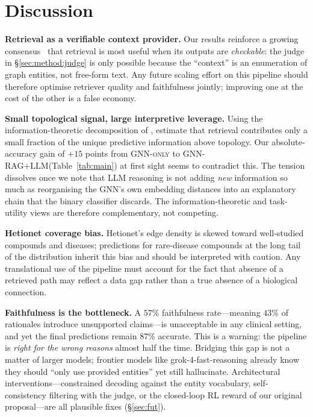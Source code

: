 \documentclass{article}
\newcommand{\ours}{\textsc{GNN-RAG+LLM}\xspace}
\newcommand{\gnno}{\textsc{GNN-only}\xspace}
\begin{document}
\section{Discussion}
\label{sec:disc}

\textbf{Retrieval as a verifiable context provider.} Our results reinforce a growing consensus~\citep{lewis2020rag,mavromatis2024gnnrag} that retrieval is most useful when its outputs are \emph{checkable}: the judge in \S\ref{sec:method:judge} is only possible because the ``context'' is an enumeration of graph entities, not free-form text. Any future scaling effort on this pipeline should therefore optimise retriever quality and faithfulness jointly; improving one at the cost of the other is a false economy.

\textbf{Small topological signal, large interpretive leverage.} Using the information-theoretic decomposition of \citet{bertschinger2014unique}, \citet{hays2026raggnn} estimate that retrieval contributes only a small fraction of the unique predictive information above topology. Our absolute-accuracy gain of $+15$ points from \gnno to \ours (Table~\ref{tab:main}) at first sight seems to contradict this. The tension dissolves once we note that LLM reasoning is not adding \emph{new} information so much as reorganising the GNN's own embedding distances into an explanatory chain that the binary classifier discards. The information-theoretic and task-utility views are therefore complementary, not competing.

\textbf{Hetionet coverage bias.} Hetionet's edge density is skewed toward well-studied compounds and diseases; predictions for rare-disease compounds at the long tail of the distribution inherit this bias and should be interpreted with caution. Any translational use of the pipeline must account for the fact that absence of a retrieved path may reflect a data gap rather than a true absence of a biological connection.

\textbf{Faithfulness is the bottleneck.} A $57\%$ faithfulness rate---meaning $43\%$ of rationales introduce unsupported claims---is unacceptable in any clinical setting, and yet the final predictions remain $87\%$ accurate. This is a warning: the pipeline is \emph{right for the wrong reasons} almost half the time. Bridging this gap is not a matter of larger models; frontier models like grok-4-fast-reasoning already know they should ``only use provided entities'' yet still hallucinate. Architectural interventions---constrained decoding against the entity vocabulary, self-consistency filtering with the judge, or the closed-loop RL reward of our original proposal---are all plausible fixes (\S\ref{sec:fut}).
\end{document}
